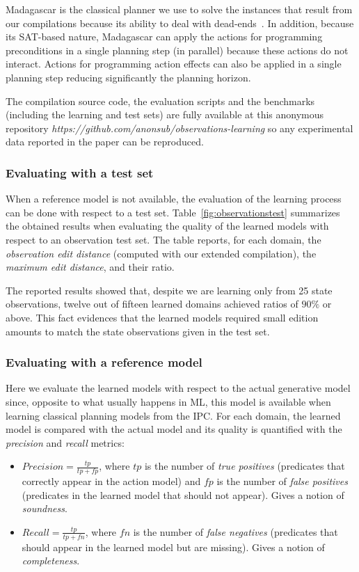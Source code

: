 \documentclass{article}
\begin{document}
{\sc Madagascar} is the classical planner we use to solve the instances that result from our compilations because its ability to deal with dead-ends~\cite{rintanen2014madagascar}. In addition, because its SAT-based nature, {\sc Madagascar} can apply the actions for programming preconditions in a single planning step (in parallel) because these actions do not interact. Actions for programming action effects can also be applied in a single planning step reducing significantly the planning horizon.

The compilation source code, the evaluation scripts and the benchmarks (including the learning and test sets) are fully available at this anonymous repository {\em https://github.com/anonsub/observations-learning} so any experimental data reported in the paper can be reproduced.

\subsubsection{Evaluating with a test set}
When a reference model is not available, the evaluation of the learning process can be done with respect to a test set. Table~\ref{fig:observationstest} summarizes the obtained results when evaluating the quality of the learned models with respect to an observation test set. The table reports, for each domain, the {\em observation edit distance} (computed with our extended compilation), the {\em maximum edit distance}, and their ratio.

The reported results showed that, despite we are learning only from 25 state observations, twelve out of fifteen learned domains achieved ratios of $90\%$ or above. This fact evidences that the learned models required small edition amounts to match the state observations given in the test set.

\subsubsection{Evaluating with a reference model}
Here we evaluate the learned models with respect to the actual generative model since, opposite to what usually happens in ML, this model is available when learning classical planning models from the IPC. For each domain, the learned model is compared with the actual model and its quality is quantified with the {\em precision} and {\em recall} metrics:
\begin{itemize}
\item $Precision=\frac{tp}{tp+fp}$, where $tp$ is the number of {\em true positives} (predicates that correctly appear in the action model) and $fp$ is the number of {\em false positives} (predicates in the learned model that should not appear). Gives a notion of {\em soundness}.
\item $Recall=\frac{tp}{tp+fn}$, where $fn$ is the number of {\em false negatives} (predicates that should appear in the learned model but are missing). Gives a notion of {\em completeness}.
\end{itemize}
\end{document}
